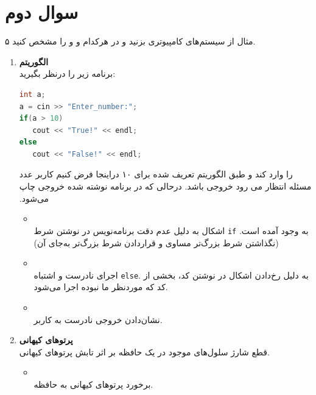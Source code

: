 \section{سوال دوم}

۵ مثال از سیستم‌های کامپیوتری بزنید و در هرکدام  و  و  را مشخص کنید.


\begin{qsolve}[]
	\begin{enumerate}
		\item 
		\textbf{الگوریتم}\\
		برنامه زیر را درنظر بگیرید:
\begin{latin}
\begin{lstlisting}[language=C++]
int a;
a = cin >> "Enter_number:";
if(a > 10)
   cout << "True!" << endl;
else
   cout << "False!" << endl;
\end{lstlisting} 
\end{latin}

‫در‬‫اینجا‬ ‫فرض‬ ‫کنیم‬ ‫کاربر‬ ‫عدد‬ ‫‪۱۰‬‬ ‫را‬ ‫وارد‬ ‫کند‬ ‫و‬ ‫طبق‬ ‫الگوریتم‬ ‫تعریف‬ ‫شده‬ ‫برای‬ ‫مسئله‬ ‫انتظار‬ ‫می‬ ‫رود‬ ‫خروجی  باشد. درحالی که در برنامه نوشته شده خروجی  چاپ می‌شود.

	
	\begin{itemize}
		\item {}\\
		اشکال به دلیل عدم دقت برنامه‌نویس در نوشتن شرط \texttt{if} به وجود آمده است. (نگذاشتن شرط بزرگ‌تر مساوی و قراردادن شرط بزرگ‌تر به‌جای آن)
		
		\item {}\\
		اجرای نادرست و اشتباه \texttt{else}. به دلیل رخ‌دادن اشکال در نوشتن کد، بخشی از کد که موردنظر ما نبوده اجرا می‌شود.
		
		\item {}\\
		نشان‌دادن خروجی نادرست به کاربر.
	\end{itemize}
	
	
	
	
	\item 
	\textbf{پرتوهای کیهانی}\\
	قطع شارژ سلول‌های  موجود در یک حافظه بر اثر تابش پرتو‌های کیهانی.
	
	\begin{itemize}
		\item {}\\
		برخورد پرتو‌های کیهانی به حافظه.
		

\end{itemize}
\end{enumerate}
\end{qsolve}
